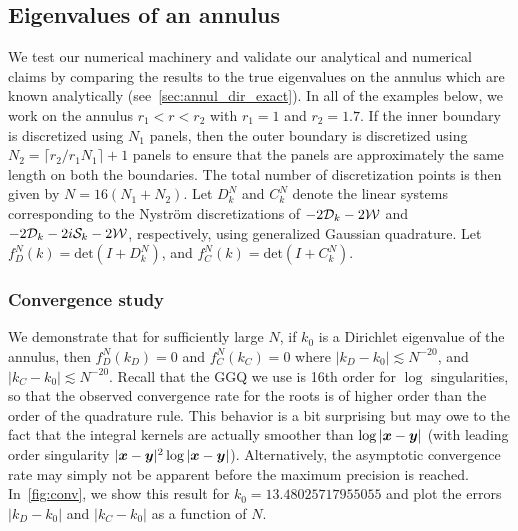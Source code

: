 \subsection{Eigenvalues of an annulus}
We test our numerical machinery and validate our analytical 
and numerical claims
by comparing the results to the true eigenvalues on the annulus
which are known analytically (see~\cref{sec:annul_dir_exact}).
In all of the examples below, we work on the annulus $r_{1}<r<r_{2}$
with $r_{1} = 1$ and $r_{2} = 1.7$.
If the inner boundary is discretized using $N_{1}$ panels, 
then the outer boundary is discretized using $N_{2} = 
\lceil r_{2}/r_{1} N_{1} \rceil +1$ panels to ensure that the
panels are approximately the same length on both the boundaries. 
The total number of discretization points 
is then given by $N = 16(N_{1} + N_{2})$.
{\color{red}Let $D^{N}_{k}$ and $C^{N}_{k}$ denote the linear
  systems corresponding to the Nystr\"{o}m discretizations of
  $-2{\mathcal D}_{k} -2{\mathcal W}$ and $-2{\mathcal D}_{k} - 2i{\mathcal S}_{k} -2{\mathcal W}$,
  respectively, using generalized Gaussian quadrature.}
Let $f_{D}^{N}(k) = \text{det}(I+D^{N}_{k})$, and 
$f_{C}^{N}(k) = \text{det}(I+C^{N}_{k})$.

\subsubsection{Convergence study}
\label{subsec:convannulus}
We demonstrate that 
for sufficiently large $N$, if $k_{0}$ is a Dirichlet 
eigenvalue of the annulus, 
then $f_{D}^{N}(k_{D}) = 0$ and $f_{C}^{N}(k_{C}) = 0$
where $|k_{D} - k_{0}| \lesssim N^{-20}$, 
and $|k_{C} - k_{0}| \lesssim N^{-20}$.
Recall that the GGQ we use {\color{red} is 16th order
  for $\log$ singularities, so that the observed convergence
  rate for the roots is of higher order than the
  order of the quadrature rule. This behavior is a bit
  surprising but may owe to the fact that the integral
  kernels are actually smoother than $\log|{\boldsymbol x}-{\boldsymbol y}|$
  (with leading order singularity $|{\boldsymbol x}-{\boldsymbol y}|^2\log|{\boldsymbol x}-{\boldsymbol y}|$).
  Alternatively, the asymptotic convergence rate may simply
  not be apparent before the maximum precision is reached.}
In~\cref{fig:conv}, we show this result for $k_{0} = 13.48025717955055$
and plot the errors $|k_{D}-k_{0}|$ and $|k_{C}-k_{0}|$ as a function
of $N$. 

